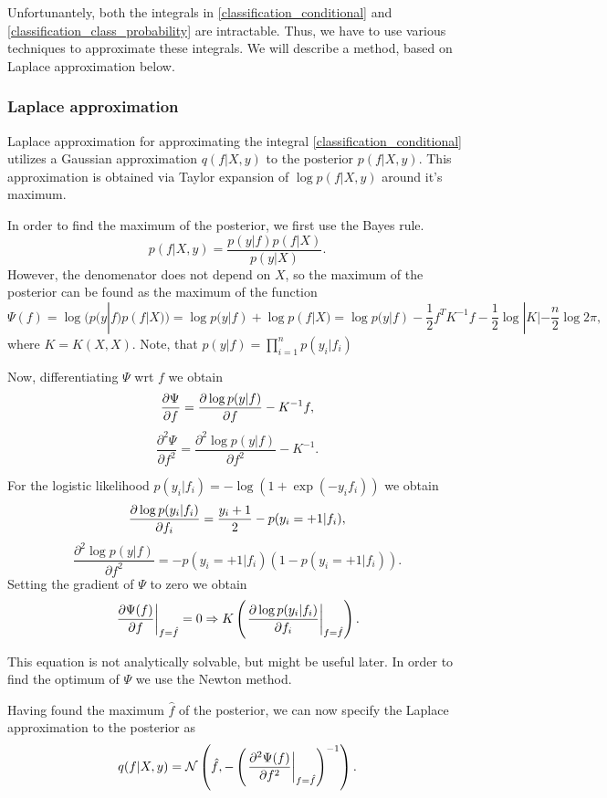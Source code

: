 \documentclass[12pt]{article}
\begin{document}
	Unfortunantely, both the integrals in \ref{classification_conditional} and \ref{classification_class_probability} are intractable. Thus, we have to use various techniques to approximate these integrals. We will describe a method, based on Laplace approximation below.

	\subsubsection{Laplace approximation}
		Laplace approximation for approximating the integral \ref{classification_conditional} utilizes a Gaussian approximation $q(f| X, y)$ to the posterior $p(f | X, y)$. This approximation is obtained via Taylor expansion of $\log p(f| X, y)$ around it's maximum.

		In order to find the maximum of the posterior, we first use the Bayes rule.
		$$p(f | X, y) = \frac{p(y | f) p(f | X)}{p(y | X)}.$$
		However, the denomenator does not depend on $X$, so the maximum of the posterior can be found as the maximum of the function
		$$\Psi(f) = \log(p(y | f) p(f | X)) = \log p(y | f) + \log p(f | X) = \log p(y | f) - \frac 1 2 f^T K^{-1} f - \frac 1 2 \log |K| - \frac n 2 \log 2 \pi,$$
		where $K = K(X, X)$. Note, that $p(y | f) = \prod_{i = 1}^n p(y_i | f_i)$

		Now, differentiating $\Psi$ wrt $f$ we obtain
		$$\frac{\partial \Psi}{\partial f} = \frac{\partial \log p(y | f)}{\partial f} - K^{-1} f,$$
		$$\frac{\partial^2\Psi}{\partial f^2} = \frac{\partial^2 \log p(y | f)}{\partial f^2} - K^{-1}.$$

		For the logistic likelihood $p(y_i | f_i) = -\log (1 + \exp(-y_i f_i))$ we obtain
		$$\frac{\partial \log p(y_i | f_i)}{\partial f_i} = \frac {y_i + 1} 2 - p(y_i = +1 | f_i),$$
		$$\frac{\partial^2 \log p(y | f)}{\partial f^2} = - p(y_i = +1 | f_i)(1 - p(y_i = +1 | f_i)).$$
		Setting the gradient of $\Psi$ to zero we obtain
		\begin{equation}
			\label{laplace_method_optt_derivative}
			\left.\frac{\partial \Psi(f)}{\partial f}\right|_{f = \hat f} = 0 \Rightarrow K\left(\left.\frac{\partial \log p(y_i | f_i)}{\partial f_i}\right|_{f = \hat f}\right).
		\end{equation}

		This equation is not analytically solvable, but might be useful later. In order to find the optimum of $\Psi$ we use the Newton method.

		Having found the maximum $\hat f$ of the posterior, we can now specify the Laplace approximation to the posterior as 
		$$q(f | X, y) = \mathcal{N} \left(\hat f, - \left(\left. \frac{\partial^2 \Psi(f)}{\partial f^2} \right|_{f = \hat f}\right)^{-1}\right).$$
\end{document}
